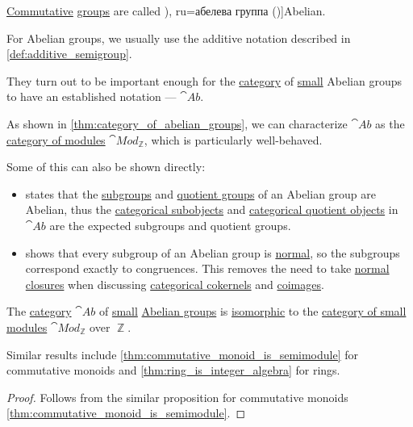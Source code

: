 \begin{definition}\label{def:abelian_group}
  \hyperref[def:binary_operation/commutative]{Commutative} \hyperref[def:group]{groups} are called \term[bg=абелева группа (\cite[390]{Обрешков1962ВисшаАлгебра}), ru=абелева группа (\cite[81]{Тыртышников2017ОсновыАлгебры})]{Abelian}.

  For Abelian groups, we usually use the additive notation described in \cref{def:additive_semigroup}.

  They turn out to be important enough for the \hyperref[def:category]{category} of \hyperref[def:small_set]{small} Abelian groups to have an established notation --- \( \cat{Ab} \).
\end{definition}
\begin{comments}
  \item As shown in \cref{thm:category_of_abelian_groups}, we can characterize \( \cat{Ab} \) as the \hyperref[def:module/category]{category of modules} \( \cat{Mod}_\BbbZ \), which is particularly well-behaved.

  Some of this can also be shown directly:
  \begin{itemize}
    \item {} states that the \hyperref[def:group/subobject]{subgroups} and \hyperref[def:group/quotient]{quotient groups} of an Abelian group are Abelian, thus the \hyperref[def:categorical_subobject]{categorical subobjects} and \hyperref[def:categorical_quotient_object]{categorical quotient objects} in \( \cat{Ab} \) are the expected subgroups and quotient groups.

    \item {} shows that every subgroup of an Abelian group is \hyperref[def:normal_subgroup]{normal}, so the subgroups correspond exactly to congruences. This removes the need to take \hyperref[def:normal_closure]{normal closures} when discussing \hyperref[def:categorical_kernels]{categorical cokernels} and \hyperref[rem:categorical_image_and_coimage]{coimages}.
  \end{itemize}
\end{comments}

\begin{proposition}\label{thm:category_of_abelian_groups}
  The \hyperref[def:category]{category} \( \cat{Ab} \) of \hyperref[def:small_set]{small} \hyperref[def:abelian_group]{Abelian groups} is \hyperref[def:isomorphism_of_categories]{isomorphic} to the \hyperref[def:module/category]{category of small modules} \( \cat{Mod}_\BbbZ \) over \( \BbbZ \).
\end{proposition}
\begin{comments}
  \item Similar results include \cref{thm:commutative_monoid_is_semimodule} for commutative monoids and \cref{thm:ring_is_integer_algebra} for rings.
\end{comments}
\begin{proof}
  Follows from the similar proposition for commutative monoids \cref{thm:commutative_monoid_is_semimodule}.
\end{proof}

